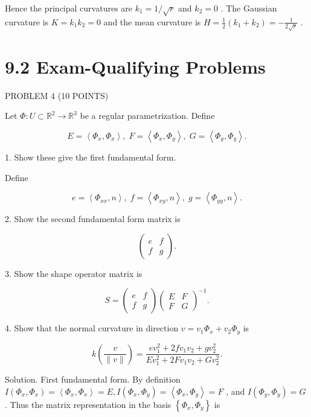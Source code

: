 \documentclass[10pt]{article}
\begin{document}
Hence the principal curvatures are \({k}_{1} = 1/\sqrt{r}\) and \({k}_{2} = 0\) . The Gaussian curvature is \(K = {k}_{1}{k}_{2} = 0\) and the mean curvature is \(H = \frac{1}{2}\left( {{k}_{1} + {k}_{2}}\right)  =  - \frac{1}{2\sqrt{r}}\) .

\section*{9.2 Exam-Qualifying Problems}

PROBLEM 4 (10 POINTS)

Let \(\Phi  : U \subset  {\mathbb{R}}^{2} \rightarrow  {\mathbb{R}}^{3}\) be a regular parametrization. Define

\[
E = \left\langle  {{\Phi }_{x},{\Phi }_{x}}\right\rangle  ,\;F = \left\langle  {{\Phi }_{x},{\Phi }_{y}}\right\rangle  ,\;G = \left\langle  {{\Phi }_{y},{\Phi }_{y}}\right\rangle  .
\]

1. Show these give the first fundamental form.

Define

\[
e = \left\langle  {{\Phi }_{xx},n}\right\rangle  ,\;f = \left\langle  {{\Phi }_{xy},n}\right\rangle  ,\;g = \left\langle  {{\Phi }_{yy},n}\right\rangle  .
\]

2. Show the second fundamental form matrix is

\[
\left( \begin{array}{ll} e & f \\  f & g \end{array}\right) .
\]

3. Show the shape operator matrix is

\[
S = \left( \begin{array}{ll} e & f \\  f & g \end{array}\right) {\left( \begin{array}{ll} E & F \\  F & G \end{array}\right) }^{-1}.
\]

4. Show that the normal curvature in direction \(v = {v}_{1}{\Phi }_{x} + {v}_{2}{\Phi }_{y}\) is

\[
k\left( \frac{v}{\parallel v\parallel }\right)  = \frac{e{v}_{1}^{2} + {2f}{v}_{1}{v}_{2} + g{v}_{2}^{2}}{E{v}_{1}^{2} + {2F}{v}_{1}{v}_{2} + G{v}_{2}^{2}}.
\]

Solution. First fundamental form. By definition \(I\left( {{\Phi }_{x},{\Phi }_{x}}\right)  = \left\langle  {{\Phi }_{x},{\Phi }_{x}}\right\rangle   = E,I\left( {{\Phi }_{x},{\Phi }_{y}}\right)  = \left\langle  {{\Phi }_{x},{\Phi }_{y}}\right\rangle   = F\) , and \(I\left( {{\Phi }_{y},{\Phi }_{y}}\right)  = G\) . Thus the matrix representation in the basis \(\left\{  {{\Phi }_{x},{\Phi }_{y}}\right\}\) is
\end{document}
